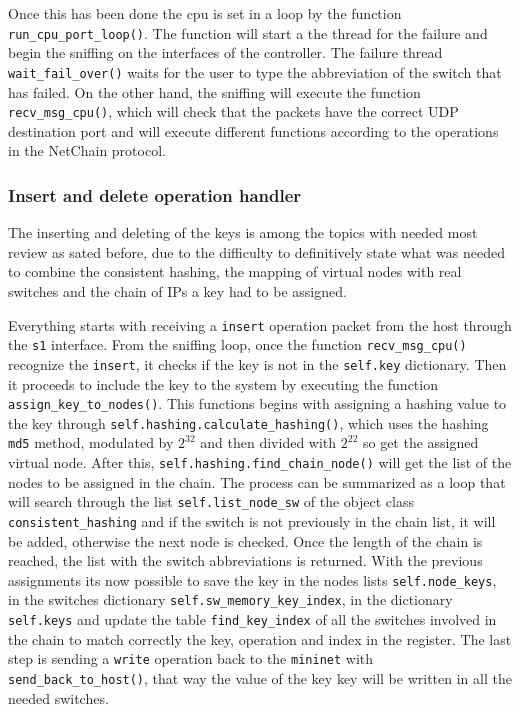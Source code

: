 \documentclass[11pt,oneside,a4paper]{article}
\begin{document}
Once this has been done the cpu is set in a loop by the function {\color{violet}\texttt{run\_cpu\_port\_loop()}}. The function will start a the thread for the failure and begin the sniffing on the interfaces of the controller. The failure thread {\color{violet}\texttt{wait\_fail\_over()}} waits for the user to type the abbreviation of the switch that has failed. On the other hand, the sniffing will execute the function {\color{violet}\texttt{recv\_msg\_cpu()}}, which will check that the packets have the correct UDP destination port and will execute different functions according to the operations in the NetChain protocol.

 
\subsubsection{Insert and delete operation handler}

The inserting and deleting of the keys is among the topics with needed most review as sated before, due to the difficulty to definitively state what was needed to combine the consistent hashing, the mapping of virtual nodes with real switches and the chain of IPs a key had to be assigned. 

Everything starts with receiving a {\color{brown}\texttt{insert}} operation packet from the host through the {\color{brown}\texttt{s1}} interface. 
From the sniffing loop, once the function {\color{violet}\texttt{recv\_msg\_cpu()}} recognize the  {\color{brown}\texttt{insert}}, it checks if the key is not in the {\color{violet}\texttt{self.key}} dictionary. Then it proceeds to include the key to the system by executing the function {\color{violet}\texttt{assign\_key\_to\_nodes()}}. This functions begins with assigning a hashing value to the key through {\color{violet}\texttt{self.hashing.calculate\_hashing()}}, which uses the hashing {\color{brown}\texttt{md5}} method, modulated by \(2^{32}\) and then divided with \(2^{22}\) so get the assigned virtual node. After this, {\color{violet}\texttt{self.hashing.find\_chain\_node()}} will get the list of the nodes to be assigned in the chain. The process can be summarized as a loop that will search through the list {\color{violet}\texttt{self.list\_node\_sw}} of the object class {\color{violet}\texttt{consistent\_hashing}} and if the switch is not previously in the chain list, it will be added, otherwise the next node is checked. Once the length of the chain is reached, the list with the switch abbreviations is returned. With the previous assignments its now possible to save the key in the nodes lists {\color{violet}\texttt{self.node\_keys}}, in the switches dictionary {\color{violet}\texttt{self.sw\_memory\_key\_index}}, in the dictionary {\color{violet}\texttt{self.keys}} and update the table {\color{red}\texttt{find\_key\_index}} of all the switches involved in the chain to match correctly the key, operation and index in the register. The last step is sending a {\color{brown}\texttt{write}} operation back to the {\color{brown}\texttt{mininet}} with {\color{violet}\texttt{send\_back\_to\_host()}}, that way the value of the key key will be written in all the needed switches. 
\end{document}

